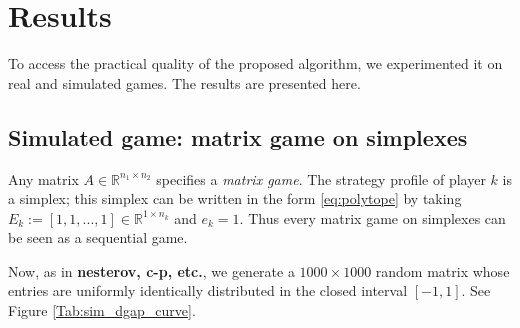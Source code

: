 \documentclass{article} %
\begin{document}
\section{Results}
To access the practical quality of the proposed algorithm, we experimented it on real and simulated games. The results are presented here.

\subsection{Simulated game: matrix game on simplexes}
Any matrix $A \in \mathbb{R}^{n_1 \times n_2}$ specifies a \textit{matrix game}. The strategy profile of player $k$ is a simplex; this simplex can be written in the form \eqref{eq:polytope} by taking $E_k := [1, 1, ..., 1] \in \mathbb{R}^{1 \times n_k}$ and $e_k = 1$. Thus every matrix game on simplexes can be seen as a sequential game.

Now, as in \textbf{nesterov, c-p, etc.}, we generate a $1000 \times 1000$ random matrix whose entries are uniformly identically distributed in the closed interval $[-1, 1]$.
See Figure \ref{Tab:sim_dgap_curve}.
\end{document}
